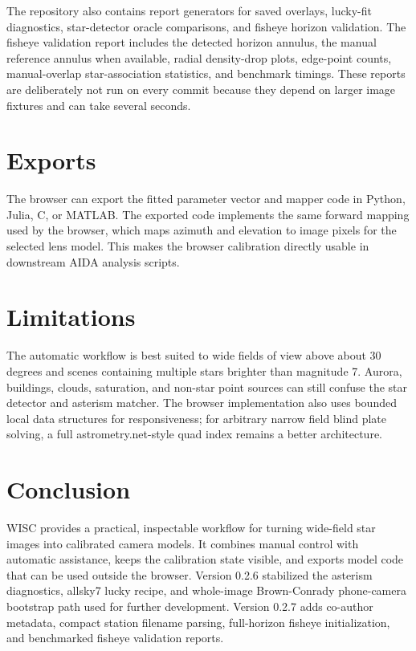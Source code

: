 \documentclass[11pt]{article}
\begin{document}
The repository also contains report generators for saved overlays, lucky-fit
diagnostics, star-detector oracle comparisons, and fisheye horizon validation.
The fisheye validation report includes the detected horizon annulus, the manual
reference annulus when available, radial density-drop plots, edge-point counts,
manual-overlap star-association statistics, and benchmark timings. These
reports are deliberately not run on every commit because they depend on larger
image fixtures and can take several seconds.

\section{Exports}

The browser can export the fitted parameter vector and mapper code in Python,
Julia, C, or MATLAB. The exported code implements the same forward mapping used
by the browser, which maps azimuth and elevation to image pixels for the
selected lens model. This makes the browser calibration directly usable in
downstream AIDA analysis scripts.

\section{Limitations}

The automatic workflow is best suited to wide fields of view above about
30 degrees and scenes containing multiple stars brighter than magnitude 7.
Aurora, buildings, clouds, saturation, and non-star point sources can still
confuse the star detector and asterism matcher. The browser implementation also
uses bounded local data structures for responsiveness; for arbitrary narrow
field blind plate solving, a full astrometry.net-style quad index remains a
better architecture.

\section{Conclusion}

WISC provides a practical, inspectable workflow for
turning wide-field star images into calibrated camera models. It combines
manual control with automatic assistance, keeps the calibration state visible,
and exports model code that can be used outside the browser. Version 0.2.6
stabilized the asterism diagnostics, allsky7 lucky recipe, and whole-image
Brown-Conrady phone-camera bootstrap path used for further development.
Version 0.2.7 adds co-author metadata, compact station filename parsing,
full-horizon fisheye initialization, and benchmarked fisheye validation
reports.
\end{document}

